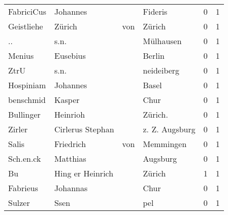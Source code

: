 \begin{tabular}{llllrr}
               FabriciCus &                           Johannes &             &                                     Fideris &          0 &         1 \\
               Geistliehe &                             Zürich &         von &                                      Zürich &          0 &         1 \\
                       .. &                               s.n. &             &                                   Mülhausen &          0 &         1 \\
                   Menius &                           Eusebius &             &                                      Berlin &          0 &         1 \\
                     ZtrU &                               s.n. &             &                                  neideiberg &          0 &         1 \\
                Hospiniam &                           Johannes &             &                                       Basel &          0 &         1 \\
                benschmid &                             Kasper &             &                                        Chur &          0 &         1 \\
                Bullinger &                           Heinrioh &             &                                    Zürich.  &          0 &         1 \\
                   Zirler &                   Cirlerus Stephan &             &                              z. Z. Augsburg &          0 &         1 \\
                    Salis &                          Friedrich &         von &                                   Memmingen &          0 &         1 \\
                Sch.en.ck &                           Matthias &             &                                    Augsburg &          0 &         1 \\
                       Bu &                   Hing er Heinrich &             &                                      Zürich &          1 &         1 \\
                 Fabrieus &                           Johannas &             &                                        Chur &          0 &         1 \\
                   Sulzer &                               Ssen &             &                                         pel &          0 &         1 \\

\end{tabular}
